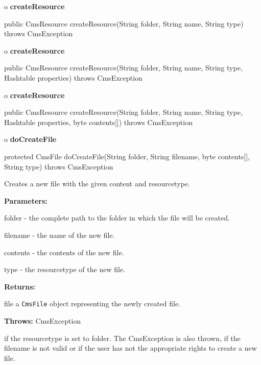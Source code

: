 o {\bf createResource} 

\begin{PRE}
 public CmsResource createResource(String folder,
                                   String name,
                                   String type) throws CmsException
\end{PRE}

o {\bf createResource} 

\begin{PRE}
 public CmsResource createResource(String folder,
                                   String name,
                                   String type,
                                   Hashtable properties) throws CmsException
\end{PRE}

o {\bf createResource} 

\begin{PRE}
 public CmsResource createResource(String folder,
                                   String name,
                                   String type,
                                   Hashtable properties,
                                   byte contents[]) throws CmsException
\end{PRE}

o {\bf doCreateFile} 

\begin{PRE}
 protected CmsFile doCreateFile(String folder,
                                String filename,
                                byte contents[],
                                String type) throws CmsException
\end{PRE}

\begin{description}
\htmlDD Creates a new file with the given content and resourcetype.\htmlBR

\begin{description}
\item {\bf Parameters:}  

folder - the complete path to the folder in which the file will be created.  

filename - the name of the new file.  

contents - the contents of the new file.  

type - the resourcetype of the new file.  
\item {\bf Returns:}  

file a {\tt CmsFile} object representing the newly created file.  
\item {\bf Throws:} CmsException  

if the resourcetype is set to folder. The CmsException is also thrown, if the
filename is not valid or if the user has not the appropriate rights to create
a new file.  
\end{description}

\end{description}

